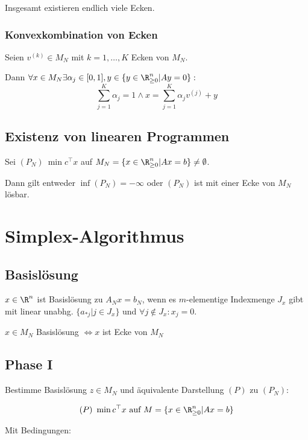 Insgesamt existieren endlich viele Ecken.

\subsubsection*{Konvexkombination von Ecken}

Seien \( v^{(k)} \in M_N \) mit \(k=1,\dots,K\) Ecken von \(M_N\).

Dann \( \forall x \in M_N \exists \alpha_j \in [0,1], y \in \{ y \in \R_{\geq 0}^n | Ay = 0 \} :\)
\[ \textstyle\sum_{j=1}^K \alpha_j = 1 \land x = \sum_{j=1}^K \alpha_j v^{(j)} + y \]

\subsection*{Existenz von linearen Programmen}

Sei \( (P_N) \ \min c^\top x \) auf \( M_N = \{ x \in \R_{\geq 0}^n | Ax = b \} \neq \emptyset\).

Dann gilt entweder \(\inf (P_N) = -\infty\) oder \((P_N)\) ist mit einer Ecke von \(M_N\) lösbar.

\section*{Simplex-Algorithmus}

\subsection*{Basislösung}

\(x \in \R^n\) ist Basislösung zu \(A_N x = b_N\), wenn es \(m\)-elementige Indexmenge \(J_x\) gibt mit linear unabhg. \(\{a_{*j} | j \in J_x\}\) und \(\forall j \notin J_x : x_j = 0\).

\spacing

\(x \in M_N\) Basislösung \(\iff x\) ist Ecke von \(M_N\)

\subsection*{Phase I}

Bestimme Basislösung \(z \in M_N\) und äquivalente Darstellung \((P)\) zu \((P_N)\):

\vspace*{-2mm}
\[ (P) \ \min c^\top x \text{ auf } M = \{ x \in \R_{\geq 0}^n | Ax=b \} \]

Mit Bedingungen:


